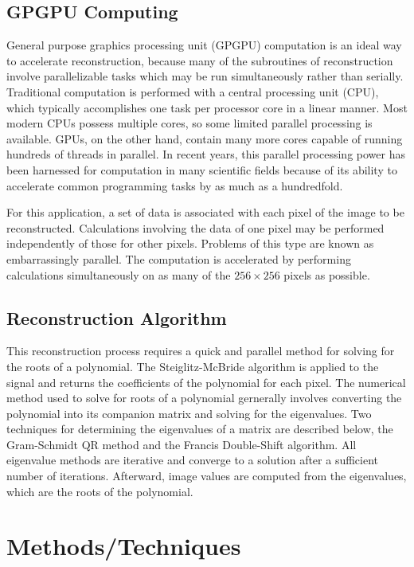 \documentclass{article}
\begin{document}
\subsection*{GPGPU Computing}
General purpose graphics processing unit (GPGPU) computation is an ideal way to accelerate reconstruction, because many of the subroutines of reconstruction involve parallelizable tasks which may be run simultaneously rather than serially. Traditional computation is performed with a central processing unit (CPU), which typically accomplishes one task per processor core in a linear manner. Most modern CPUs possess multiple cores, so some limited parallel processing is available. GPUs, on the other hand, contain many more cores capable of running hundreds of threads in parallel. In recent years, this parallel processing power has been harnessed for computation in many scientific fields because of its ability to accelerate common programming tasks by as much as a hundredfold.

For this application, a set of data is associated with each pixel of the image to be reconstructed. Calculations involving the data of one pixel may be performed independently of those for other pixels. Problems of this type are known as embarrassingly parallel. The computation is accelerated by performing calculations simultaneously on as many of the $256\times256$ pixels as possible. 

\subsection*{Reconstruction Algorithm}

This reconstruction process requires a quick and parallel method for solving for the roots of a polynomial. The Steiglitz-McBride algorithm is applied to the signal and returns the coefficients of the polynomial for each pixel. The numerical method used to solve for roots of a polynomial gernerally involves converting the polynomial into its companion matrix and solving for the eigenvalues. Two techniques for determining the eigenvalues of a matrix are described below, the Gram-Schmidt QR method and the Francis Double-Shift algorithm. All eigenvalue methods are iterative and converge to a solution after a sufficient number of iterations. Afterward, image values are computed from the eigenvalues, which are the roots of the polynomial.

\section*{Methods/Techniques}
\end{document}
